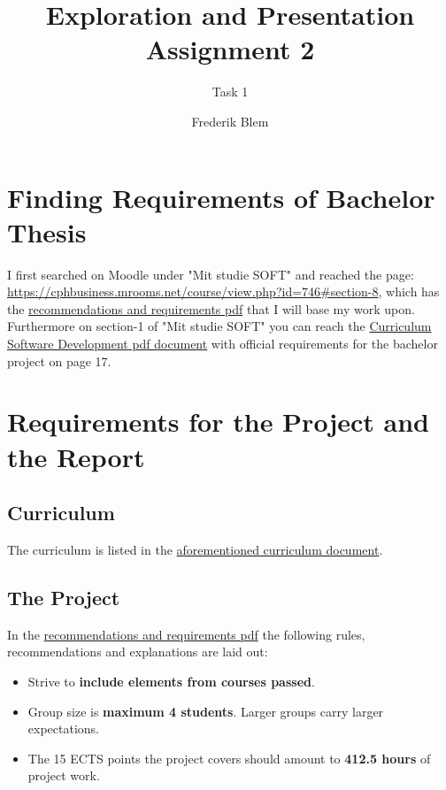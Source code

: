 \documentclass{scrartcl}
\begin{document}
\title{Exploration and Presentation Assignment 2}
\author{Frederik Blem}
\subtitle{Task 1}
\maketitle

\section{Finding Requirements of Bachelor Thesis}
I first searched on Moodle under "Mit studie SOFT" and reached the page: \url{https://cphbusiness.mrooms.net/course/view.php?id=746#section-8}{\label{label:link1}},
which has the \href{https://datsoftlyngby.github.io/soft2020fall/resources/bbe51cf2-bachelorProject.pdf}{recommendations and requirements pdf} that I will base my work upon.
Furthermore on section-1 of "Mit studie SOFT" you can reach the \href{https://www.cphbusiness.dk/media/78342/pba_soft_cba_curriculum_2017.pdf}{Curriculum Software Development pdf document} with official requirements for the bachelor project on page 17.

\section{Requirements for the Project and the Report}

\subsection{Curriculum}
\label{sec:curriculum}
The curriculum is listed in the \href{https://www.cphbusiness.dk/media/78342/pba_soft_cba_curriculum_2017.pdf}{aforementioned curriculum document}. 

\subsection{The Project}
\label{sec:project}
In the \href{https://datsoftlyngby.github.io/soft2020fall/resources/bbe51cf2-bachelorProject.pdf}{recommendations and requirements pdf} the following rules, recommendations and explanations are laid out:
\begin{itemize}
	\item Strive to \textbf{include elements from courses passed}.
	\item Group size is \textbf{maximum 4 students}. Larger groups carry larger expectations.
	\item The 15 ECTS points the project covers should amount to \textbf{412.5 hours} of project work.
\end{itemize}
\end{document}
